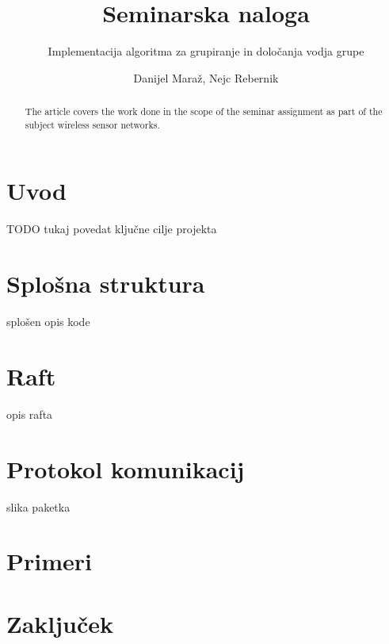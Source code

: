 \documentclass[runningheads]{llncs}
\begin{document}
\title{Seminarska naloga}
\subtitle{Implementacija algoritma za grupiranje in določanja vodja grupe}

\author{Danijel Maraž, Nejc Rebernik}


\maketitle             

\begin{abstract}
The article covers the work done in the scope of the seminar assignment as part of the subject wireless sensor networks.

\end{abstract}

\section{Uvod}
TODO tukaj povedat ključne cilje projekta

\section{Splošna struktura}
splošen opis kode
\section{Raft}
opis rafta
\section{Protokol komunikacij}
slika paketka
\section{Primeri}
\section{Zaključek}
\end{document}
